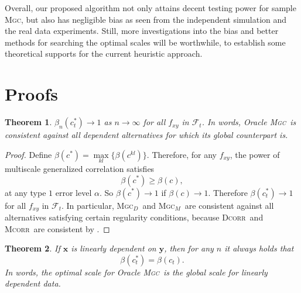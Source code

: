 \documentclass[11pt]{article}
\providecommand{\sct}[1]{{\normalfont\textsc{#1}}}
\providecommand{\mb}[1]{\boldsymbol{#1}}
\providecommand{\mc}[1]{\mathcal{#1}}
\newcommand{\G}{c}
\newcommand{\Mgc}{\sct{Mgc}}
\newcommand{\Mgcd}{\sct{Mgc$_D$}}
\newcommand{\Mgcm}{\sct{Mgc$_M$}}
\newcommand{\Dcorr}{\sct{Dcorr}}
\newcommand{\Mcorr}{\sct{Mcorr}}
\newtheorem{appThm}{Theorem}
\begin{document}
Overall, our proposed algorithm not only attains decent testing power for sample \Mgc, but also has negligible bias as seen from the independent simulation and the real data experiments.
Still, more investigations into the bias and better methods for searching the optimal scales will be worthwhile, to establish some theoretical supports for the current heuristic approach.


\section{Proofs}
\label{appen:proofs}
\begin{appThm}
$\beta_n(\G_t^*) \rightarrow 1$ as $n \to \infty$ for all $f_{xy}$ in $\mc{F}_t$.
In words, Oracle \Mgc~is consistent against all dependent alternatives for which its global counterpart is. 
\end{appThm}
\begin{proof}
Define $\beta(\G^{*})=\underset{kl}{\max}\{\beta(\G^{kl})\}$. Therefore, for any $f_{xy}$, the power of multiscale generalized correlation satisfies
\begin{equation*}
\beta(\G^*) \geq \beta(\G),
\end{equation*}
at any type $1$ error level $\alpha$. So $\beta(\G^{*}) \rightarrow 1$ if $\beta(\G) \rightarrow 1$.
% 
Therefore $\beta(\G_t^*) \rightarrow 1$ for all $f_{xy}$ in $\mc{F}_t$. In particular, \Mgcd~and \Mgcm~are consistent against all alternatives satisfying certain regularity conditions, because \Dcorr~and \Mcorr~are consistent by \cite{SzekelyRizzoBakirov2007, SzekelyRizzo2013a}. 
\end{proof}

\begin{appThm}
If $\mb{x}$ is linearly dependent on $\mb{y}$, then for any $n$ it always holds that
\begin{equation}
\beta(\G^{*}_t) = \beta(\G_t).
\end{equation}
In words, the optimal scale for Oracle \Mgc~is the global scale for linearly dependent data.
\end{appThm}
\end{document}
